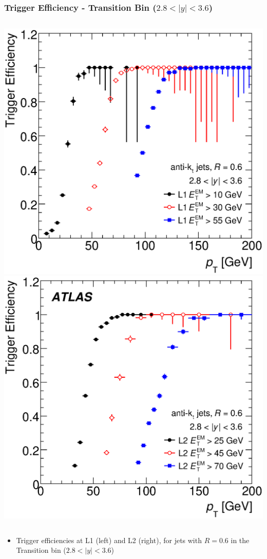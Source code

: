 \documentclass[10pt]{beamer}
\begin{document}
\begin{frame}\frametitle{Trigger Efficiency - Transition Bin ($2.8 < |y| < 3.6$)}
\begin{columns}
\includegraphics[width=0.7\linewidth,angle=0]{L1_triggers_transition_bin_akt6.eps}
\includegraphics[width=0.7\linewidth,angle=0]{L1L2_triggers_transition_binm_akt6.eps}
\end{columns}
\begin{itemize}
\item Trigger efficiencies at L1 (left) and L2 (right), for jets with $R=0.6$ in the Transition bin ($2.8 < |y| < 3.6$)
\end{itemize}
\end{frame}
\end{document}
